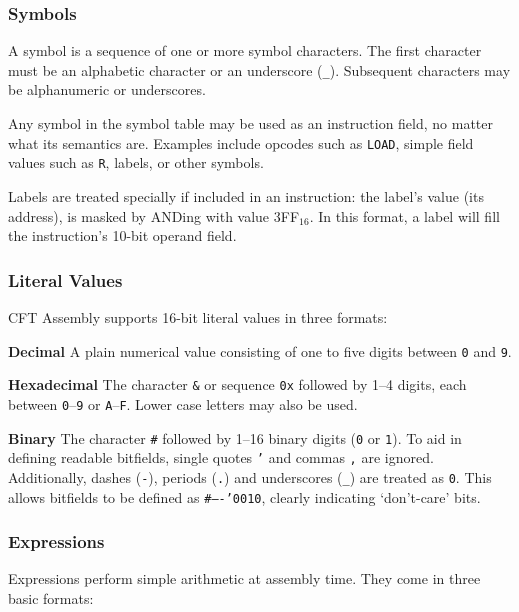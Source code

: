 \documentclass[11pt,a4paper,twocolumns]{article}
\newcommand\op[1]{\texttt{#1}}
\newcommand\f[1]{{\color{black}\texttt{#1}}}
\newcommand\hex[1]{\textsf{#1}}
\begin{document}
\subsubsection{Symbols}

A symbol is a sequence of one or more symbol characters. The first character
must be an alphabetic character or an underscore (\f{\_}). Subsequent characters
may be alphanumeric or underscores.

Any symbol in the symbol table may be used as an instruction field, no matter
what its semantics are. Examples include opcodes such as \op{LOAD}, simple
field values such as \op{R}, labels, or other symbols.

Labels are treated specially if included in an instruction: the label's value (its
address), is masked by ANDing with value \hex{3FF}$_{16}$. In this format, a label
will fill the instruction's 10-bit operand field.

\subsubsection{Literal Values}

CFT Assembly supports 16-bit literal values in three formats:

\begin{description}
\item{\bf Decimal} A plain numerical value consisting of one to five digits
  between \f{0} and \f{9}.
\item{\bf Hexadecimal} The character \f{\&} or sequence \f{0x} followed by 1–4 digits,
  each between \f{0}–\f{9} or \f{A}–\f{F}. Lower case letters may also be used.
\item{\bf Binary} The character \f{\#} followed by 1–16 binary digits (\f{0} or
  \f{1}). To aid in defining readable bitfields, single quotes \f{'} and commas
  \f{,} are ignored. Additionally, dashes (\f{-}), periods (\f{.}) and
  underscores (\f{\_}) are treated as \f{0}. This allows bitfields to be
  defined as \f{\#----'0010}, clearly indicating ‘don't-care’ bits.
\end{description}

\subsubsection{Expressions}

Expressions perform simple arithmetic at assembly time. They come in three basic
formats:
\end{document}
